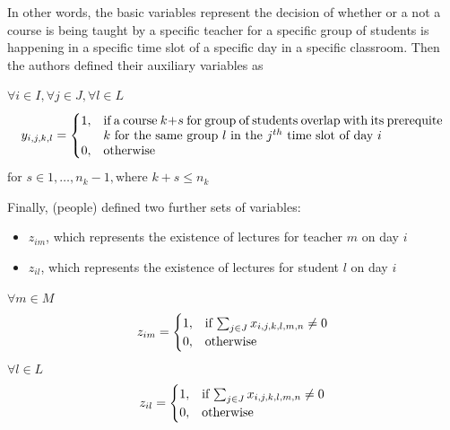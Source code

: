\documentclass[a4paper, 12pt]{report}
\begin{document}
In other words, the basic variables represent the decision of whether or a not
a course is being taught by a specific teacher for a specific group of students
is happening in a specific time slot of a specific day in a specific classroom.
Then the authors defined their auxiliary variables as

\begin{math}
	\forall i \in I, \forall j \in J, \forall l \in L
\end{math}
\begin{align*}
	y_{i,j,k,l} = 
	\begin{cases}
		1, & \parbox[t]{9.5cm}{if a course \( k + s \) for group of students
		overlap with its prerequite \( k \) for the same group \( l \) in the 
		\( j^{th} \) time slot of day \( i \)} \\
		0, & \text{otherwise}
	\end{cases}	
\end{align*}
\begin{math}
	\text{for } s \in 1, \ldots, n_k - 1, \text{where } k + s \leq n_k	
\end{math}

Finally, (people) defined two further sets of variables:
\begin{itemize}
	\item \( z_{im} \), which represents the existence of lectures for teacher 
		\( m \) on day \( i \)
	\item \( z_{il} \), which represents the existence of lectures for student 
		\( l \) on day \( i \)
\end{itemize}
\begin{math}
	\forall m \in M
\end{math}
\begin{align*}
	z_{im} =
	\begin{cases}
		1, & \text{if \( \sum_{j \in J} x_{i,j,k,l,m,n} \neq 0 \)} \\
		0, & \text{otherwise}
	\end{cases}	
\end{align*}
\begin{math}
	\forall l \in L
\end{math}
\begin{align*}
	z_{il} =
	\begin{cases}
		1, & \text{if \( \sum_{j \in J} x_{i,j,k,l,m,n} \neq 0 \)} \\
		0, & \text{otherwise}
	\end{cases}	
\end{align*}
\end{document}
